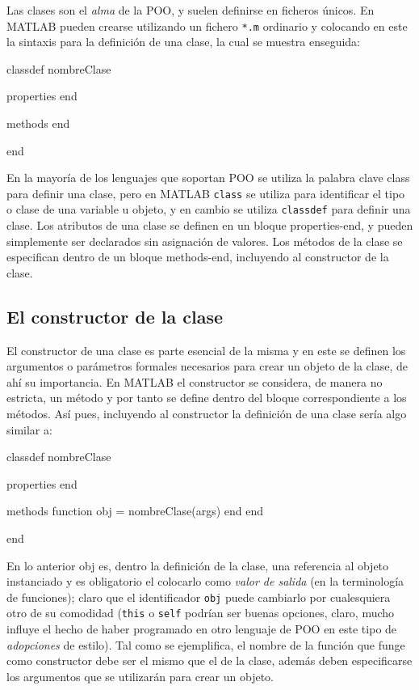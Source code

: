 Las clases son el \emph{alma} de la POO, y suelen definirse en ficheros
únicos. En MATLAB pueden crearse utilizando un fichero \verb|*.m| ordinario y
colocando en este la sintaxis para la definición de una clase, la cual
se muestra enseguida:

\begin{matlab}
classdef nombreClase
    
    properties
    end
    
    methods
    end
    
end
\end{matlab}

En la mayoría de los lenguajes que soportan POO se utiliza la palabra
clave class para definir una clase, pero en MATLAB \texttt{class} se
utiliza para identificar el tipo o clase de una variable u objeto, y en
cambio se utiliza \texttt{classdef} para definir una clase. Los
atributos de una clase se definen en un bloque properties-end, y pueden
simplemente ser declarados sin asignación de valores. Los métodos de la
clase se especifican dentro de un bloque methods-end, incluyendo al
constructor de la clase.

\subsection{El constructor de la clase}

El constructor de una clase es parte esencial de la misma y en este se
definen los argumentos o parámetros formales necesarios para crear un
objeto de la clase, de ahí su importancia. En MATLAB el constructor se
considera, de manera no estricta, un método y por tanto se define dentro
del bloque correspondiente a los métodos. Así pues, incluyendo al
constructor la definición de una clase sería algo similar a:

\begin{matlab}
classdef nombreClase
    
    properties
    end
    
    methods
        function obj = nombreClase(args)
        end
    end
    
end
\end{matlab}

En lo anterior obj es, dentro la definición de la clase, una referencia
al objeto instanciado y es obligatorio el colocarlo como \emph{valor de
salida} (en la terminología de funciones); claro que el identificador
\texttt{obj} puede cambiarlo por cualesquiera otro de su comodidad
(\texttt{this} o \texttt{self} podrían ser buenas opciones, claro, mucho
influye el hecho de haber programado en otro lenguaje de POO en este
tipo de \emph{adopciones} de estilo). Tal como se ejemplifica, el nombre
de la función que funge como constructor debe ser el mismo que el de la
clase, además deben especificarse los argumentos que se utilizarán para
crear un objeto.

